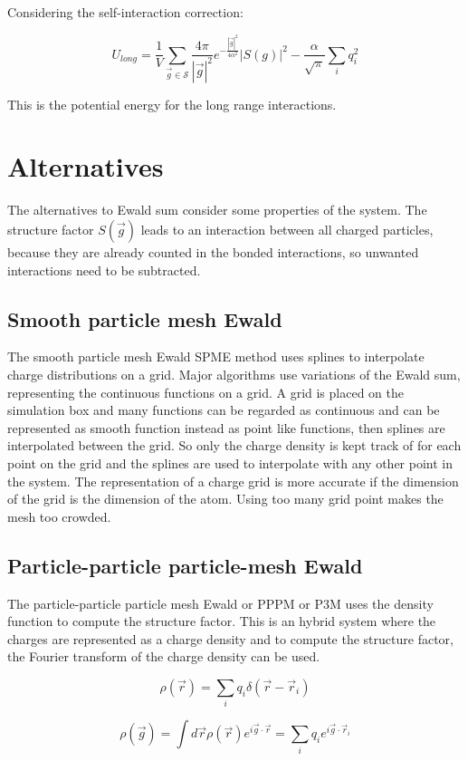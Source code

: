 	Considering the self-interaction correction:

	$$U_{long} = \frac{1}{V}\sum\limits_{\vec{g}\in\mathcal{S}}\frac{4\pi}{|\vec{g}|^2}e^{-\frac{|\vec{g}|^2}{4\alpha^2}}|S(g)|^2-\frac{\alpha}{\sqrt{\pi}}\sum\limits_iq_i^2$$

	This is the potential energy for the long range interactions.

\section{Alternatives}
The alternatives to Ewald sum consider some properties of the system.
The structure factor $S(\vec{g})$ leads to an interaction between all charged particles, because they are already counted in the bonded interactions, so unwanted interactions need to be subtracted.

	\subsection{Smooth particle mesh Ewald}
	The smooth particle mesh Ewald SPME method uses splines to interpolate charge distributions on a grid.
	Major algorithms use variations of the Ewald sum, representing the continuous functions on a grid.
	A grid is placed on the simulation box and many functions can be regarded as continuous and can be represented as smooth function instead as point like functions, then splines are interpolated between the grid.
	So only the charge density is kept track of for each point on the grid and the splines are used to interpolate with any other point in the system.
	The representation of a charge grid is more accurate if the dimension of the grid is the dimension of the atom.
	Using too many grid point makes the mesh too crowded.


	\subsection{Particle-particle particle-mesh Ewald}
	The particle-particle particle mesh Ewald or PPPM or P3M uses the density function to compute the structure factor.
	This is an hybrid system where the charges are represented as a charge density and to compute the structure factor, the Fourier transform of the charge density can be used.

	$$\rho(\vec{r}) = \sum\limits_{i}q_i\delta(\vec{r}-\vec{r}_i)$$

	$$\rho(\vec{g}) = \int d\vec{r}\rho(\vec{r})e^{i\vec{g}\cdot\vec{r}} = \sum\limits_i q_i e^{i\vec{g}\cdot\vec{r}_i}$$

